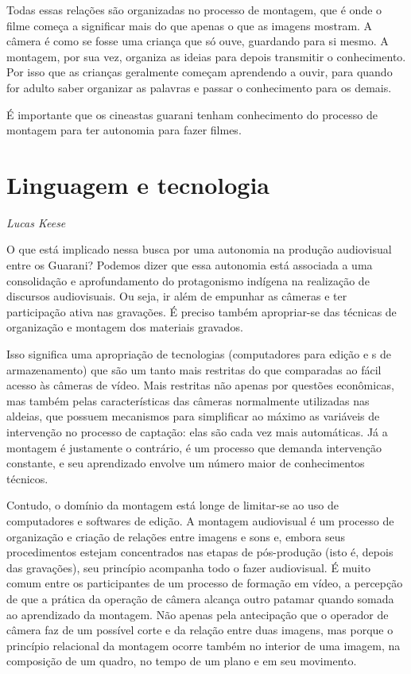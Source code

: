 {{Todas essas relações são organizadas no processo de montagem, que é onde
o filme começa a significar mais do que apenas o que as imagens
mostram. A câmera é como se fosse uma criança que só ouve, guardando
para si mesmo. A montagem, por sua vez, organiza as ideias para depois
transmitir o conhecimento. Por isso que as crianças geralmente começam
aprendendo a ouvir, para quando for adulto saber organizar as palavras
e passar o conhecimento para os demais.

É importante que os cineastas guarani tenham conhecimento do processo de
montagem para ter autonomia para fazer filmes. 

\chapter{Linguagem e tecnologia}
\begin{flushright}
\emph{Lucas Keese}
\end{flushright}
\medskip

O que está implicado nessa busca por uma autonomia na produção
audiovisual entre os Guarani? Podemos dizer que essa autonomia está
associada a uma consolidação e aprofundamento do protagonismo indígena
na realização de discursos audiovisuais. Ou seja, ir além de empunhar
as câmeras e ter participação ativa nas gravações. É preciso também
apropriar-se das técnicas de organização e montagem dos materiais
gravados.

Isso significa uma apropriação de tecnologias (computadores para edição
e s de armazenamento) que são um tanto mais restritas do que
comparadas ao fácil acesso às câmeras de vídeo. Mais restritas não
apenas por questões econômicas, mas também pelas características das
câmeras normalmente utilizadas nas aldeias, que possuem mecanismos para
simplificar ao máximo as variáveis de intervenção no processo de
captação: elas são cada vez mais automáticas. Já a montagem é
justamente o contrário, é um processo que demanda intervenção
constante, e seu aprendizado envolve um número maior de conhecimentos
técnicos.

Contudo, o domínio da montagem está longe de limitar-se ao uso de
computadores e softwares de edição. A montagem audiovisual é um
processo de organização e criação de relações entre imagens e sons e,
embora seus procedimentos estejam concentrados nas etapas de
pós-produção (isto é, depois das gravações), seu princípio acompanha
todo o fazer audiovisual. É muito comum entre os participantes de um
processo de formação em vídeo, a percepção de que a prática da operação
de câmera alcança outro patamar quando somada ao aprendizado da
montagem. Não apenas pela antecipação que o operador de câmera faz de
um possível corte e da relação entre duas imagens, mas porque o
princípio relacional da montagem ocorre também no interior de uma
imagem, na composição de um quadro, no tempo de um plano e em seu
movimento.

}}
